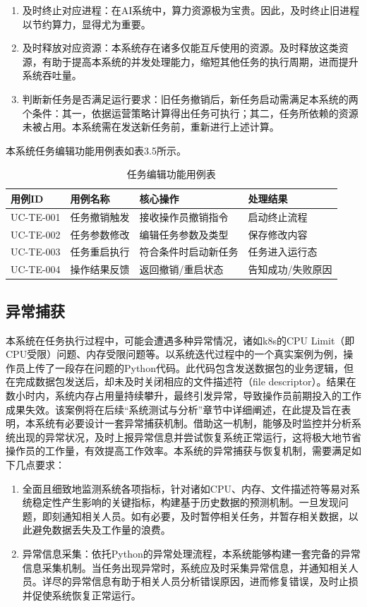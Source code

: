 \begin{enumerate}
	\item 及时终止对应进程：在AI系统中，算力资源极为宝贵。因此，及时终止旧进程以节约算力，显得尤为重要。
	\item 及时释放对应资源：本系统存在诸多仅能互斥使用的资源。及时释放这类资源，有助于提高本系统的并发处理能力，缩短其他任务的执行周期，进而提升系统吞吐量。
	\item 判断新任务是否满足运行要求：旧任务撤销后，新任务启动需满足本系统的两个条件：其一，依据运营策略计算得出任务可执行；其二，任务所依赖的资源未被占用。本系统需在发送新任务前，重新进行上述计算。
\end{enumerate}

本系统任务编辑功能用例表如表3.5所示。

\begin{table}[htbp]
    \centering
    \caption{任务编辑功能用例表}
    \begin{tabular}{llll}
        \toprule
        \textbf{用例ID} & \textbf{用例名称} & \textbf{核心操作} & \textbf{处理结果} \\
        \midrule
        UC-TE-001 & 任务撤销触发 & 接收操作员撤销指令 & 启动终止流程 \\
        UC-TE-002 & 任务参数修改 & 编辑任务参数及类型 & 保存修改内容 \\
        UC-TE-003 & 任务重启执行 & 符合条件时启动新任务 & 任务进入运行态 \\
        UC-TE-004 & 操作结果反馈 & 返回撤销/重启状态 & 告知成功/失败原因 \\
        \bottomrule
    \end{tabular}
    \label{tab:task_editing_cases}
\end{table}

\subsection{异常捕获}

本系统在任务执行过程中，可能会遭遇多种异常情况，诸如k8s的CPU Limit（即CPU受限）问题、内存受限问题等。以系统迭代过程中的一个真实案例为例，操作员上传了一段存在问题的Python代码。此代码包含发送数据包的业务逻辑，但在完成数据包发送后，却未及时关闭相应的文件描述符（file descriptor）。结果在数小时内，系统内存占用量持续攀升，最终引发异常，导致操作员前期投入的工作成果失效。该案例将在后续“系统测试与分析”章节中详细阐述，在此提及旨在表明，本系统有必要设计一套异常捕获机制。借助这一机制，能够及时监控并分析系统出现的异常状况，及时上报异常信息并尝试恢复系统正常运行，这将极大地节省操作员的工作量，有效提高工作效率。本系统的异常捕获与恢复机制，需要满足如下几点要求：
\begin{enumerate}
	\item 全面且细致地监测系统各项指标，针对诸如CPU、内存、文件描述符等易对系统稳定性产生影响的关键指标，构建基于历史数据的预测机制。一旦发现问题，即刻通知相关人员。如有必要，及时暂停相关任务，并暂存相关数据，以此避免数据丢失及工作量的浪费。
	\item 异常信息采集：依托Python的异常处理流程，本系统能够构建一套完备的异常信息采集机制。当任务出现异常时，系统应及时采集异常信息，并通知相关人员。详尽的异常信息有助于相关人员分析错误原因，进而修复错误，及时止损并促使系统恢复正常运行。
\end{enumerate}

